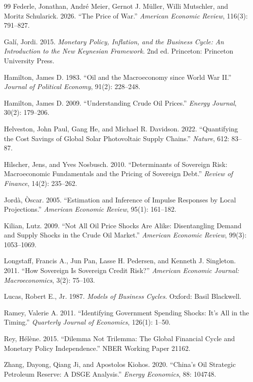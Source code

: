 \documentclass[12pt]{article}
\begin{document}
\begin{thebibliography}{99}
Federle, Jonathan, Andr\'{e} Meier, Gernot J. M\"{u}ller, Willi Mutschler, and Moritz Schularick. 2026. ``The Price of War.'' \textit{American Economic Review}, 116(3): 791--827.

Gal\'{i}, Jordi. 2015. \textit{Monetary Policy, Inflation, and the Business Cycle: An Introduction to the New Keynesian Framework}. 2nd ed. Princeton: Princeton University Press.

Hamilton, James D. 1983. ``Oil and the Macroeconomy since World War II.'' \textit{Journal of Political Economy}, 91(2): 228--248.

Hamilton, James D. 2009. ``Understanding Crude Oil Prices.'' \textit{Energy Journal}, 30(2): 179--206.

Helveston, John Paul, Gang He, and Michael R. Davidson. 2022. ``Quantifying the Cost Savings of Global Solar Photovoltaic Supply Chains.'' \textit{Nature}, 612: 83--87.

Hilscher, Jens, and Yves Nosbusch. 2010. ``Determinants of Sovereign Risk: Macroeconomic Fundamentals and the Pricing of Sovereign Debt.'' \textit{Review of Finance}, 14(2): 235--262.

Jord\`{a}, \`{O}scar. 2005. ``Estimation and Inference of Impulse Responses by Local Projections.'' \textit{American Economic Review}, 95(1): 161--182.

Kilian, Lutz. 2009. ``Not All Oil Price Shocks Are Alike: Disentangling Demand and Supply Shocks in the Crude Oil Market.'' \textit{American Economic Review}, 99(3): 1053--1069.

Longstaff, Francis A., Jun Pan, Lasse H. Pedersen, and Kenneth J. Singleton. 2011. ``How Sovereign Is Sovereign Credit Risk?'' \textit{American Economic Journal: Macroeconomics}, 3(2): 75--103.

Lucas, Robert E., Jr. 1987. \textit{Models of Business Cycles}. Oxford: Basil Blackwell.

Ramey, Valerie A. 2011. ``Identifying Government Spending Shocks: It's All in the Timing.'' \textit{Quarterly Journal of Economics}, 126(1): 1--50.

Rey, H\'{e}l\`{e}ne. 2015. ``Dilemma Not Trilemma: The Global Financial Cycle and Monetary Policy Independence.'' NBER Working Paper 21162.

Zhang, Dayong, Qiang Ji, and Apostolos Kiohos. 2020. ``China's Oil Strategic Petroleum Reserve: A DSGE Analysis.'' \textit{Energy Economics}, 88: 104748.

\end{thebibliography}
\end{document}

